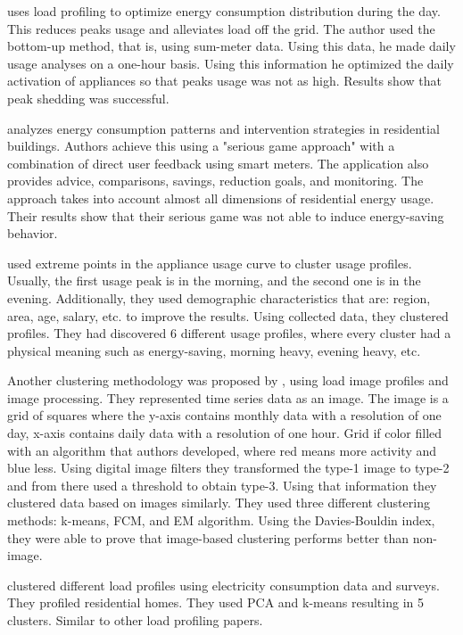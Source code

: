 \cite{Chuan2014} uses load profiling to optimize energy consumption distribution during the day.
This reduces peaks usage and alleviates load off the grid. The author used the bottom-up method, that is, using sum-meter data.
Using this data, he made daily usage analyses on a one-hour basis. Using this information he optimized the daily activation of appliances
so that peaks usage was not as high. Results show that peak shedding was successful. 

\cite{Csoknyai2019} analyzes energy consumption patterns and intervention strategies in residential buildings.
Authors achieve this using a "serious game approach" with a combination of direct user feedback using smart meters. 
The application also provides advice, comparisons, savings, reduction goals, and monitoring.
The approach takes into account almost all dimensions of residential energy usage. Their results show that their serious game was not
able to induce energy-saving behavior.

\cite{Jeong2021} used extreme points in the appliance usage curve to cluster usage profiles.
Usually, the first usage peak is in the morning, and the second one is in the evening. 
Additionally, they used demographic characteristics that are: region, area, age, salary, etc. to improve the results.
Using collected data, they clustered profiles. They had discovered 6 different usage profiles, 
where every cluster had a physical meaning such as energy-saving, morning heavy, evening heavy, etc.

Another clustering methodology was proposed by \cite{Park2019}, using load image profiles and image processing.
They represented time series data as an image. The image is a grid of squares where the y-axis contains monthly data with a resolution of one day,
x-axis contains daily data with a resolution of one hour. Grid if color filled with an algorithm that authors developed,
where red means more activity and blue less. Using digital image filters they transformed the type-1 image to type-2 and from there
used a threshold to obtain type-3. Using that information they clustered data based on images similarly. They used three different 
clustering methods: k-means, FCM, and EM algorithm. Using the Davies-Bouldin index, they were able to prove that image-based clustering performs better than non-image.

\cite{Joana2012} clustered different load profiles using electricity consumption data and surveys. They profiled residential homes. 
They used PCA and k-means resulting in 5 clusters. Similar to other load profiling papers. 

